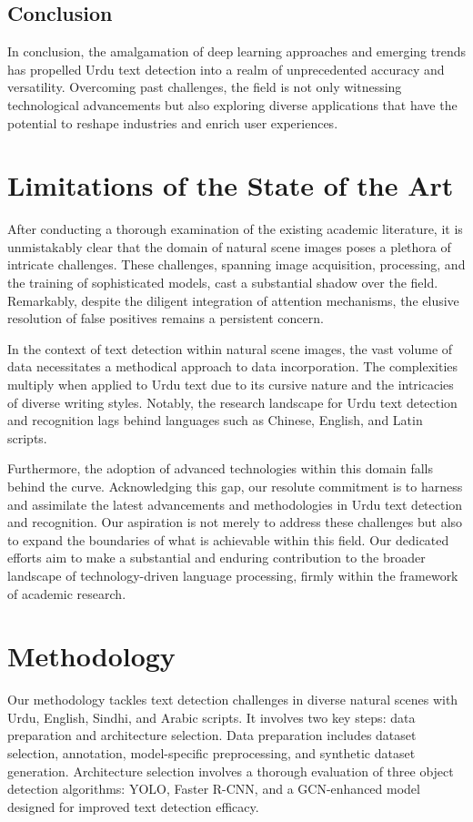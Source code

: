 \documentclass[default,iicol]{sn-jnl}%
\begin{document}
	\subsection{Conclusion}
	
	In conclusion, the amalgamation of deep learning approaches and emerging trends has propelled Urdu text detection into a realm of unprecedented accuracy and versatility. Overcoming past challenges, the field is not only witnessing technological advancements but also exploring diverse applications that have the potential to reshape industries and enrich user experiences.
	
\section{Limitations of the State of the Art} \label{losota}
After conducting a thorough examination of the existing academic literature, it is unmistakably clear that the domain of natural scene images poses a plethora of intricate challenges. These challenges, spanning image acquisition, processing, and the training of sophisticated models, cast a substantial shadow over the field. Remarkably, despite the diligent integration of attention mechanisms, the elusive resolution of false positives remains a persistent concern.

In the context of text detection within natural scene images, the vast volume of data necessitates a methodical approach to data incorporation. The complexities multiply when applied to Urdu text due to its cursive nature and the intricacies of diverse writing styles. Notably, the research landscape for Urdu text detection and recognition lags behind languages such as Chinese, English, and Latin scripts.

Furthermore, the adoption of advanced technologies within this domain falls behind the curve. Acknowledging this gap, our resolute commitment is to harness and assimilate the latest advancements and methodologies in Urdu text detection and recognition. Our aspiration is not merely to address these challenges but also to expand the boundaries of what is achievable within this field. Our dedicated efforts aim to make a substantial and enduring contribution to the broader landscape of technology-driven language processing, firmly within the framework of academic research.
\section{Methodology}
Our methodology tackles text detection challenges in diverse natural scenes with Urdu, English, Sindhi, and Arabic scripts. It involves two key steps: data preparation and architecture selection. Data preparation includes dataset selection, annotation, model-specific preprocessing, and synthetic dataset generation. Architecture selection involves a thorough evaluation of three object detection algorithms: YOLO, Faster R-CNN, and a GCN-enhanced model designed for improved text detection efficacy.
\end{document}
